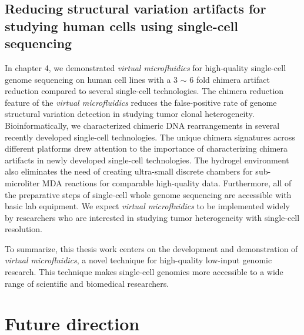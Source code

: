 \subsection{Reducing structural variation artifacts for studying human cells using single-cell sequencing}
In chapter 4, we demonstrated \textit{virtual microfluidics} for high-quality single-cell genome sequencing on human cell lines with a 3 $\sim$ 6 fold chimera artifact reduction compared to several single-cell technologies. The chimera reduction feature of the \textit{virtual microfluidics} reduces the false-positive rate of genome structural variation detection in studying tumor clonal heterogeneity. Bioinformatically, we characterized chimeric DNA rearrangements in several recently developed single-cell technologies. The unique chimera signatures across different platforms drew attention to the importance of characterizing chimera artifacts in newly developed single-cell technologies. The hydrogel environment also eliminates the need of creating ultra-small discrete chambers for sub-microliter MDA reactions for comparable high-quality data. Furthermore, all of the preparative steps of single-cell whole genome sequencing are accessible with basic lab equipment. We expect \textit{virtual microfluidics} to be implemented widely by researchers who are interested in studying tumor heterogeneity with single-cell resolution.  

To summarize, this thesis work centers on the development and demonstration of \textit{virtual microfluidics}, a novel technique for high-quality low-input genomic research. This technique makes single-cell genomics more accessible to a wide range of scientific and biomedical researchers. 

\section{Future direction}
